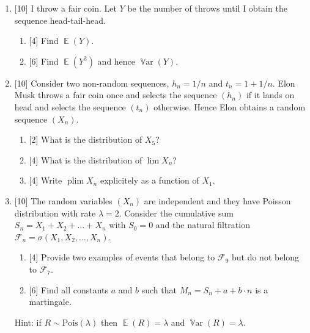 \documentclass[12pt]{article}
\DeclareMathOperator{\Var}{\mathbb{V}ar}
\DeclareMathOperator{\E}{\mathbb{E}}
\DeclareMathOperator{\plim}{plim}
\newcommand{\cF}{\mathcal{F}}
\newcommand{\dPois}{\mathrm{Pois}}
\begin{document}
\begin{enumerate}
    \newpage

    \item {[10]} I throw a fair coin. 
    Let $Y$ be the number of throws until I obtain the sequence head-tail-head. 

    \begin{enumerate}
        \item {[4]} Find $\E(Y)$.
        \item {[6]} Find $\E(Y^2)$ and hence $\Var(Y)$.
    \end{enumerate}


    \item {[10]} Consider two non-random sequences, $h_n = 1/n$ and $t_n = 1 + 1/n$.
    Elon Musk throws a fair coin once and selects the sequence $(h_n)$ if it lands on head and selects the sequence $(t_n)$ otherwise.
    Hence Elon obtains a random sequence $(X_n)$.

    \begin{enumerate}
        \item {[2]} What is the distribution of $X_5$?
        \item {[4]} What is the distribution of $\lim X_n$?
        \item {[4]} Write $\plim X_n$ explicitely as a function of $X_1$.
    \end{enumerate}
    
    \item {[10]} The random variables $(X_n)$ are independent and they have Poisson distribution with rate $\lambda = 2$. 
    Consider the cumulative sum $S_n = X_1 + X_2 + \dots + X_n$ with $S_0 = 0$
    and the natural filtration $\cF_n = \sigma(X_1, X_2, \dots, X_n)$.

    \begin{enumerate}
        \item {[4]} Provide two examples of events that belong to $\cF_9$ but do not belong to $\cF_7$.
        \item {[6]} Find all constants $a$ and $b$ such that $M_n = S_n + a + b \cdot n$ is a martingale. 
    \end{enumerate}

    Hint: if $R \sim \dPois(\lambda)$ then $\E(R) = \lambda$ and $\Var(R) = \lambda$. 

\end{enumerate}
\end{document}
